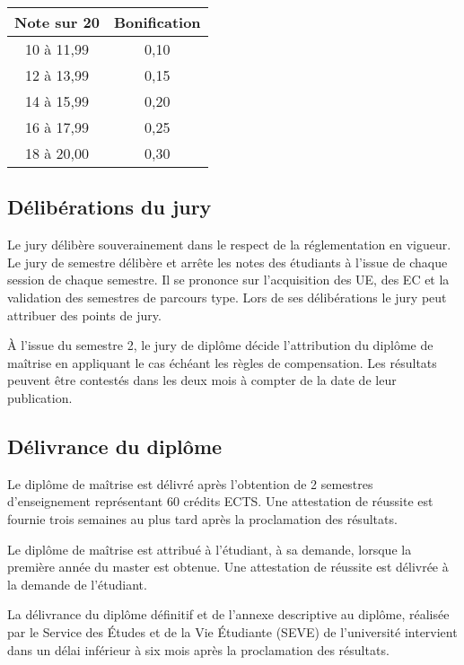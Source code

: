 \documentclass[a4paper,11pt]{article}
\begin{document}
\begin{table}[htpb] 
\begin{center}
    \begin{tabular}{c c}
        \toprule
        Note sur 20 & Bonification\\ 
        \midrule
        10 à 11,99 & 0,10 \\ 
        12 à 13,99 & 0,15 \\ 
        14 à 15,99 & 0,20 \\ 
        16 à 17,99 & 0,25 \\ 
        18 à 20,00 & 0,30 \\ 
        \bottomrule
    \end{tabular} 
\end{center}
\end{table}


\subsection{Délibérations du jury}
Le jury délibère souverainement dans le respect de la réglementation en vigueur.
Le jury de semestre délibère et arrête les notes des étudiants à l'issue de chaque session de chaque semestre. Il se prononce sur l'acquisition des UE, des EC et la validation des semestres de parcours type.
Lors de ses délibérations le jury peut attribuer des points de jury.

À l'issue du semestre 2, le jury de diplôme décide l'attribution du diplôme de maîtrise en appliquant le cas échéant les règles de compensation.
Les résultats peuvent être contestés dans les deux mois à compter de la date de leur publication.


\subsection{Délivrance du diplôme}
Le diplôme de maîtrise est délivré après l'obtention de 2 semestres d'enseignement représentant 60 crédits ECTS. Une attestation de réussite est fournie trois semaines au plus tard après la proclamation des résultats.

Le diplôme de maîtrise est attribué à l'étudiant, à sa demande, lorsque la première année du master est obtenue. Une attestation de réussite est délivrée à la demande de l'étudiant.

La délivrance du diplôme définitif et de l'annexe descriptive au diplôme, réalisée par le Service des Études et de la Vie Étudiante (SEVE) de l'université intervient dans un délai inférieur à six mois après la proclamation des résultats.
\end{document}
